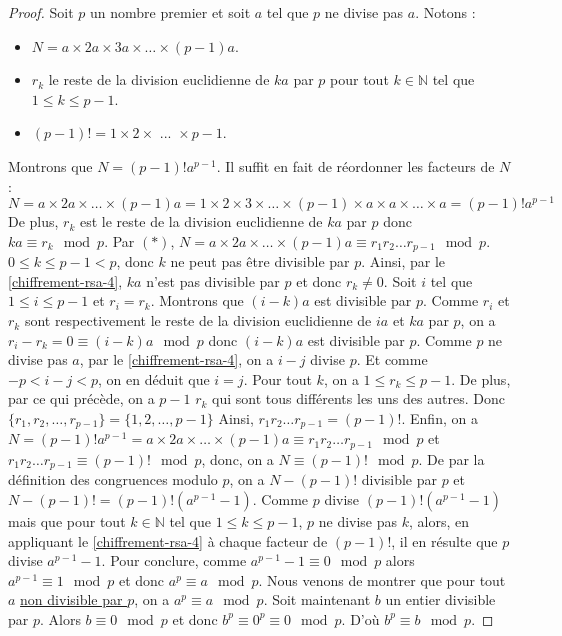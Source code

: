  \begin{proof}
    Soit $p$ un nombre premier et soit $a$ tel que $p$ ne divise pas $a$. Notons :
    \begin{itemize}
      \item $N = a \times 2a \times 3a \times \dots \times (p-1)a$.
      \item $r_k$ le reste de la division euclidienne de $ka$ par $p$ pour tout $k \in \mathbb{N}$ tel que $1 \leq k \leq p-1$.
      \item $(p-1)! = 1 \times 2 \times \text { ... } \times p-1$.
    \end{itemize}
    Montrons que $N = (p-1)! a^{p-1}$. Il suffit en fait de réordonner les facteurs de $N$ :
    \[ N = a \times 2a \times \dots \times (p-1)a = 1 \times 2 \times 3 \times \dots \times (p-1) \times a \times a \times \dots \times a = (p-1)!a^{p-1} \tag{$*$} \]
    De plus, $r_k$ est le reste de la division euclidienne de $ka$ par $p$ donc $ka \equiv r_k \mod p$. Par $(*)$, $N = a \times 2a \times \dots \times (p-1)a \equiv r_1 r_2 \dots r_{p-1} \mod p$. $0 \leq k \leq p-1 < p$, donc $k$ ne peut pas être divisible par $p$. Ainsi, par le \cref{chiffrement-rsa-4}, $ka$ n'est pas divisible par $p$ et donc $r_k \neq 0$.
    \newpar
    Soit $i$ tel que $1 \leq i \leq p-1$ et $r_i = r_k$. Montrons que $(i-k)a$ est divisible par $p$. Comme $r_i$ et $r_k$ sont respectivement le reste de la division euclidienne de $ia$ et $ka$ par $p$, on a $r_i - r_k = 0 \equiv (i-k)a \mod p$ donc $(i-k)a$ est divisible par $p$. Comme $p$ ne divise pas $a$, par le \cref{chiffrement-rsa-4}, on a $i-j$ divise $p$. Et comme $-p < i-j < p$, on en déduit que $i=j$.
    \newpar
    Pour tout $k$, on a $1 \leq r_k \leq p-1$. De plus, par ce qui précède, on a $p-1$ $r_k$ qui sont tous différents les uns des autres. Donc $\{r_1, r_2, \dots, r_{p-1} \} = \{1, 2, \dots, p-1 \}$  Ainsi, $r_1 r_2 \dots r_{p-1} = (p-1)!$.
    \newpar
    Enfin, on a $N = (p-1)!a^{p-1} = a \times 2a \times \dots \times (p-1)a \equiv r_1 r_2 \dots r_{p-1} \mod p$ et $r_1 r_2 \dots r_{p-1} \equiv (p-1)! \mod p$, donc, on a $N \equiv (p-1)! \mod p$. De par la définition des congruences modulo $p$, on a $N - (p-1)!$ divisible par $p$ et $N - (p-1)! = (p-1)!(a^{p-1} - 1)$. Comme $p$ divise $(p-1)!(a^{p-1} - 1)$ mais que pour tout $k \in \mathbb{N}$ tel que $1 \leq k \leq p-1$, $p$ ne divise pas $k$, alors, en appliquant le \cref{chiffrement-rsa-4} à chaque facteur de $(p-1)!$, il en résulte que $p$ divise $a^{p-1} - 1$.
    \newpar
    Pour conclure, comme $a^{p-1} - 1 \equiv 0 \mod p$ alors $a^{p-1} \equiv 1 \mod p$ et donc $a^p \equiv a \mod p$. Nous venons de montrer que pour tout $a$ \uline{non divisible par $p$}, on a $a^p \equiv a \mod p$. Soit maintenant $b$ un entier divisible par $p$. Alors $b \equiv 0 \mod p$ et donc $b^p \equiv 0^p \equiv 0 \mod p$. D'où $b^p \equiv b \mod p$.
  \end{proof}
  
